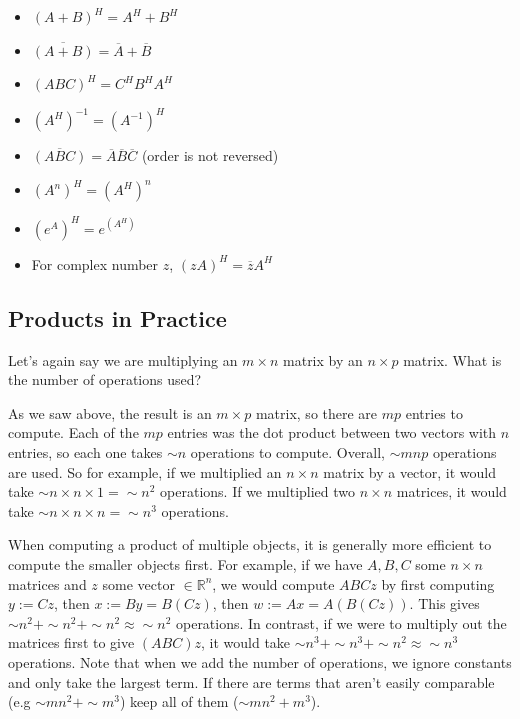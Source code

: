 \documentclass[11pt]{article}
\theoremstyle{plain} %
\theoremstyle{definition}
\theoremstyle{remark}
\begin{document}
\begin{itemize}
\item $(A+B)^H = A^H + B^H$
\item $\overline{(A+B)} = \overline A + \overline B$
\item $(ABC)^H = C^HB^HA^H$
\item $(A^H)^{-1} = (A^{-1})^H$
\item $\overline{(ABC)} = \overline{A}\overline{B}\overline{C}$ (order is not reversed)
\item $(A^n)^H = (A^H)^n$
\item $\left(e^{A}\right)^H = e^{(A^{H})}$
\item For complex number $z$, $(zA)^H = \overline{z} A^{H}$
\end{itemize}


\subsection{Products in Practice}

Let's again say we are multiplying an $m \times n$ matrix by an $n \times p$ matrix. What is the number of operations used?

As we saw above, the result is an $m \times p$ matrix, so there are $mp$ entries to compute. Each of the $mp$ entries was the dot product between two vectors with $n$ entries, so each one takes $\sim n$ operations to compute. Overall, $\sim mnp$ operations are used. So for example, if we multiplied an $n\times n$ matrix by a vector, it would take $\sim n \times n \times 1 = \sim n^2$ operations. If we multiplied two $n\times n$ matrices, it would take $\sim n \times n \times n = \sim n^3$ operations.

When computing a product of multiple objects, it is generally more efficient to compute the smaller objects first. For example, if we have $A, B, C$ some $n \times n$ matrices and $z$ some vector $\in \mathbb{R}^n$, we would compute $ABCz$ by first computing $y := Cz$, then $x := By = B(Cz)$, then $w := Ax = A(B(Cz))$. This gives $\sim n^2 + \sim n^2 + \sim n^2 \approx \sim n^2$ operations. In contrast, if we were to multiply out the matrices first to give $(ABC)z$, it would take $\sim n^3 + \sim n^3 + \sim n^2 \approx \sim n^3$ operations. Note that when we add the number of operations, we ignore constants and only take the largest term. If there are terms that aren't easily comparable (e.g $\sim mn^2 + \sim m^3$) keep all of them ($\sim mn^2 + m^3$).
\end{document}
